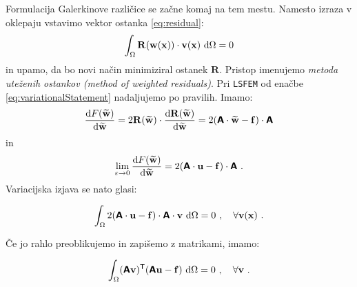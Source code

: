Formulacija Galerkinove različice se začne komaj na tem mestu. Namesto izraza v oklepaju vstavimo vektor ostanka \eqref{eq:residual}:
\begin{equation}
	\int_{\Omega} \mathbf{R(w(x))} \cdot \mathbf{v(x)} \ \mathrm{d} \Omega = 0
\end{equation}
in upamo, da bo novi način minimiziral ostanek $\mathbf{R}$. Pristop imenujemo \emph{metoda uteženih ostankov (method of weighted residuals)}. Pri \texttt{LSFEM} od enačbe \eqref{eq:variationalStatement} nadaljujemo po pravilih. Imamo:
\begin{equation}
	\frac{\mathrm{d} F(\widetilde{\mathbf{w}})}{\mathrm{d} \widetilde{\mathbf{w}}} = 2 \mathbf{R(\widetilde{w})} \cdot \frac{\mathrm{d} \mathbf{R(\widetilde{w})}}{\mathrm{d} \mathbf{\widetilde{w}}} = 2 (\bm{\mathsf{A}} \cdot \mathbf{\widetilde{w}} - \mathbf{f}) \cdot \bm{\mathsf{A}}
\end{equation}
in
\begin{equation}
	\lim_{\varepsilon \rightarrow 0} \frac{\mathrm{d} F(\widetilde{\mathbf{w}})}{\mathrm{d} \widetilde{\mathbf{w}}} = 2 (\bm{\mathsf{A}} \cdot \mathbf{u} - \mathbf{f}) \cdot \bm{\mathsf{A}} \ .
\end{equation}
Variacijska izjava se nato glasi:
\begin{equation}
	\int_{\Omega} 2 (\mathbsf{A} \cdot \mathbf{u} - \mathbf{f}) \cdot \mathbsf{A} \cdot \mathbf{v} \ \ud \Omega = 0 \ , \quad \forall \mathbf{v(\mathbf{x})} \ . \vphantom{\Biggr{)}}
\end{equation}
Če jo rahlo preoblikujemo in zapišemo z matrikami, imamo:
\begin{equation}
	\int_{\Omega} (\mathbsf{A} \mathbf{v})^\mathsf{T} (\mathbsf{A} \mathbf{u} - \mathbf{f}) \ \ud \Omega = 0 \ , \quad \forall \mathbf{v} \ . \vphantom{\Biggr{)}}
\end{equation}